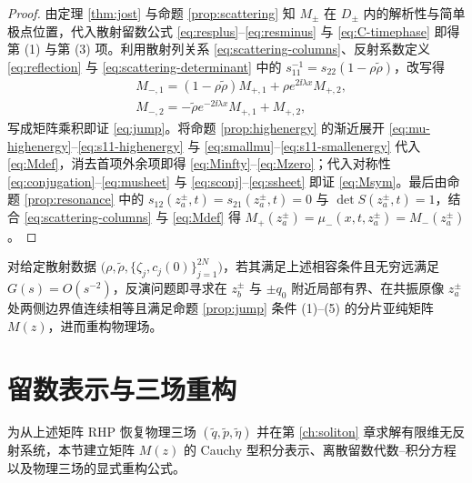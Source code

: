 \begin{proof}
由定理 \ref{thm:jost} 与命题 \ref{prop:scattering} 知 $M_\pm$ 在 $D_\pm$ 内的解析性与简单极点位置，代入散射留数公式 \eqref{eq:resplus}--\eqref{eq:resminus} 与 \eqref{eq:C-timephase} 即得第 (1) 与第 (3) 项。利用散射列关系 \eqref{eq:scattering-columns}、反射系数定义 \eqref{eq:reflection} 与 \eqref{eq:scattering-determinant} 中的 $s_{11}^{-1}=s_{22}(1-\rho\widetilde\rho)$，改写得
\begin{equation*}
\begin{aligned}
&M_{-,1}=(1-\rho\widetilde\rho)M_{+,1}+\rho e^{2\ii\lambda x}M_{+,2},\\
&M_{-,2}=-\widetilde\rho e^{-2\ii\lambda x}M_{+,1}+M_{+,2},
\end{aligned}
\end{equation*}
写成矩阵乘积即证 \eqref{eq:jump}。将命题 \ref{prop:highenergy} 的渐近展开 \eqref{eq:mu-highenergy}--\eqref{eq:s11-highenergy} 与 \eqref{eq:smallmu}--\eqref{eq:s11-smallenergy} 代入 \eqref{eq:Mdef}，消去首项外余项即得 \eqref{eq:Minfty}--\eqref{eq:Mzero}；代入对称性 \eqref{eq:conjugation}--\eqref{eq:musheet} 与 \eqref{eq:sconj}--\eqref{eq:ssheet} 即证 \eqref{eq:Msym}。最后由命题 \ref{prop:resonance} 中的 $s_{12}(z_a^\pm,t)=s_{21}(z_a^\pm,t)=0$ 与 $\det S(z_a^\pm,t)=1$，结合 \eqref{eq:scattering-columns} 与 \eqref{eq:Mdef} 得 $M_+(z_a^\pm)=\mu_-(x,t,z_a^\pm)=M_-(z_a^\pm)$。
\end{proof}

对给定散射数据 $\bigl(\rho,\widetilde\rho,\{\zeta_j,c_j(0)\}_{j=1}^{2N}\bigr)$，若其满足上述相容条件且无穷远满足 $G(s)=O(s^{-2})$，反演问题即寻求在 $z_b^\pm$ 与 $\pm q_0$ 附近局部有界、在共振原像 $z_a^\pm$ 处两侧边界值连续相等且满足命题 \ref{prop:jump} 条件 (1)--(5) 的分片亚纯矩阵 $M(z)$，进而重构物理场。

\section{留数表示与三场重构}

为从上述矩阵 RHP 恢复物理三场 $(\widetilde q,\widetilde p,\widetilde\eta)$ 并在第 \ref{ch:soliton} 章求解有限维无反射系统，本节建立矩阵 $M(z)$ 的 Cauchy 型积分表示、离散留数代数--积分方程以及物理三场的显式重构公式。


